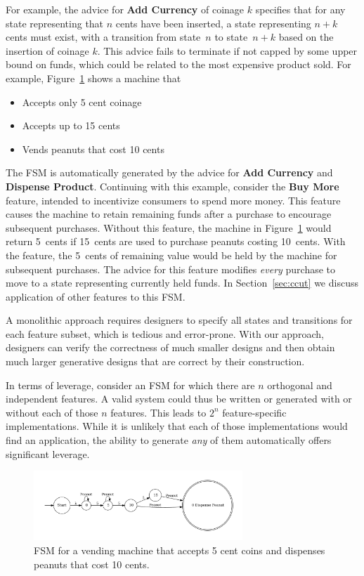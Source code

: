 \documentclass[conference]{IEEEtran}
\begin{document}
For example, the advice for \textbf{Add Currency} of coinage $k$ specifies that for any state representing that $n$ cents have been inserted, a state representing $n+k$ cents must exist, with a transition from state~$n$ to state~$n+k$ based on the insertion of coinage $k$.   This advice fails to terminate if not capped by some upper bound on funds, which could be related to the most expensive product sold. For example, Figure~\ref{fig:vend1} shows a machine that
\begin{itemize}
    \item Accepts only 5 cent coinage
    \item Accepts up to 15 cents
    \item Vends peanuts that cost 10 cents
\end{itemize}
The FSM is automatically generated by the advice for \textbf{Add Currency} and \textbf{Dispense Product}.  Continuing with this example, consider the \textbf{Buy More} feature, intended to incentivize consumers to spend more money.  This feature causes the machine to retain remaining funds after a purchase to encourage subsequent purchases.  Without this feature, the machine in Figure~\ref{fig:vend1} would return 5~cents if 15~cents are used to purchase peanuts costing 10~cents.  With the feature, the 5~cents of remaining value would be held by the machine for subsequent purchases.  The advice for this feature modifies \emph{every} purchase to move to a state representing currently held funds.  In Section~\ref{sec:ccut} we discuss application of other features to this FSM.

A monolithic approach requires designers to specify all states and transitions for each feature subset, which is tedious and error-prone. With our approach, designers can verify the correctness of much smaller designs and then obtain much larger generative designs that are correct by their construction.

In terms of leverage, consider an FSM for which there are $n$ orthogonal and independent features.  A valid system could thus be written or generated with or without each of those $n$ features.  This leads to $2^{n}$ feature-specific implementations.  While it is unlikely that each of those implementations would find an application, the ability to generate \emph{any} of them automatically offers significant leverage.

\begin{figure}
    \centering
    \includegraphics[width=0.7\textwidth]{figures/vend1.pdf}
    \caption{FSM for a vending machine that accepts 5 cent coins and dispenses peanuts that cost 10 cents.}
    \label{fig:vend1}
\end{figure}
\end{document}
